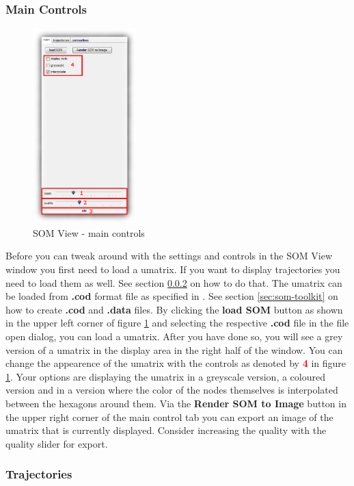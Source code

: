 \documentclass[a4paper]{scrartcl}
\newcommand{\imagenumber}[1]{\textcolor{red}{\textbf{#1}}}
\begin{document}
\subsubsection{Main Controls}
\begin{figure}
\centering
\includegraphics[width=4cm]{graphics/somview_main.png}
\caption{SOM View - main controls}
\label{fig:controls-main}
\end{figure}
Before you can tweak around with the settings and controls in the SOM View window you first need to load a umatrix. If you want to display trajectories you need to load them as well. See section \ref{sec:trajectories} on how to do that.
The umatrix can be loaded from \textbf{.cod} format file as specified in \cite{toolbox-manual}. See section \ref{sec:som-toolkit} on how to create \textbf{.cod} and \textbf{.data} files.
By clicking the \textbf{load SOM} button as shown in the upper left corner of figure \ref{fig:controls-main} and selecting the respective \textbf{.cod} file in the file open dialog, you can load a umatrix. After you have done so, you will see a grey version of a umatrix in the display area in the right half of the window. You can change the appearence of the umatrix with the controls as denoted by \imagenumber{4} in figure \ref{fig:controls-main}.
Your options are displaying the umatrix in a greyscale version, a coloured version and in a version where the color of the nodes themselves is interpolated between the hexagons around them.
Via the \textbf{Render SOM to Image} button in the upper right corner of the main control tab you can export an image of the umatrix that is currently displayed. Consider increasing the quality with the quality slider for export.

\subsubsection{Trajectories}
\label{sec:trajectories}
\end{document}
